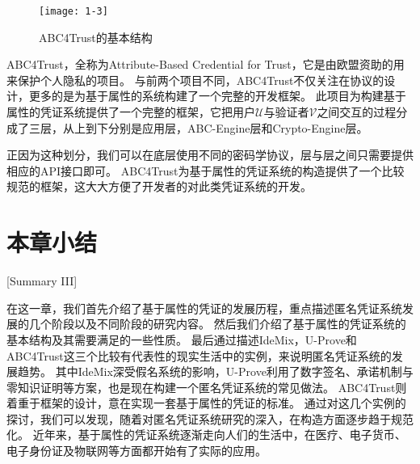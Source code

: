 \begin{figure}[h]
\centering
\texttt{[image: 1-3]}
\caption{ABC4Trust的基本结构}
\end{figure}

ABC4Trust，全称为Attribute-Based Credential for Trust，它是由欧盟资助的用来保护个人隐私的项目\cite{sabouri2012attribute}。
与前两个项目不同，ABC4Trust不仅关注在协议的设计，更多的是为基于属性的系统构建了一个完整的开发框架。
此项目为构建基于属性的凭证系统提供了一个完整的框架，它把用户$\mathcal{U}$与验证者$\mathcal{V}$之间交互的过程分成了三层，从上到下分别是应用层，ABC-Engine层和Crypto-Engine层。

正因为这种划分，我们可以在底层使用不同的密码学协议，层与层之间只需要提供相应的API接口即可。
ABC4Trust为基于属性的凭证系统的构造提供了一个比较规范的框架，这大大方便了开发者的对此类凭证系统的开发。

\section{本章小结}[Summary III]

在这一章，我们首先介绍了基于属性的凭证的发展历程，重点描述匿名凭证系统发展的几个阶段以及不同阶段的研究内容。
然后我们介绍了基于属性的凭证系统的基本结构及其需要满足的一些性质。
最后通过描述IdeMix，U-Prove和ABC4Trust这三个比较有代表性的现实生活中的实例，来说明匿名凭证系统的发展趋势。
其中IdeMix深受假名系统的影响，U-Prove利用了数字签名、承诺机制与零知识证明等方案，也是现在构建一个匿名凭证系统的常见做法。
ABC4Trust则着重于框架的设计，意在实现一套基于属性的凭证的标准。
通过对这几个实例的探讨，我们可以发现，随着对匿名凭证系统研究的深入，在构造方面逐步趋于规范化。
近年来，基于属性的凭证系统逐渐走向人们的生活中，在医疗、电子货币、电子身份证及物联网等方面都开始有了实际的应用。